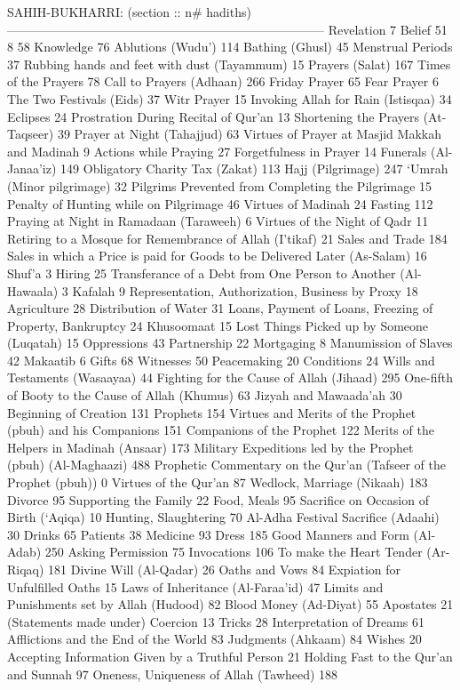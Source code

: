 SAHIH-BUKHARRI:                                       (section :: n# hadiths)
-----------------------------------------------------------------------------
Revelation	7
Belief	51	8	58
Knowledge	76
Ablutions (Wudu')	114
Bathing (Ghusl)	45
Menstrual Periods	37
Rubbing hands and feet with dust (Tayammum)	15
Prayers (Salat)	167
Times of the Prayers	78
Call to Prayers (Adhaan)	266
Friday Prayer	65
Fear Prayer	6
The Two Festivals (Eids)	37
Witr Prayer	15
Invoking Allah for Rain (Istisqaa)	34
Eclipses	24
Prostration During Recital of Qur'an	13
Shortening the Prayers (At-Taqseer)	39
Prayer at Night (Tahajjud)	63
Virtues of Prayer at Masjid Makkah and Madinah	9
Actions while Praying	27
Forgetfulness in Prayer	14
Funerals (Al-Janaa'iz)	149
Obligatory Charity Tax (Zakat)	113
Hajj (Pilgrimage)	247
`Umrah (Minor pilgrimage)	32
Pilgrims Prevented from Completing the Pilgrimage	15
Penalty of Hunting while on Pilgrimage	46
Virtues of Madinah	24
Fasting	112
Praying at Night in Ramadaan (Taraweeh)	6
Virtues of the Night of Qadr	11
Retiring to a Mosque for Remembrance of Allah (I'tikaf)	21
Sales and Trade	184
Sales in which a Price is paid for Goods to be Delivered Later (As-Salam)	16
Shuf'a	3
Hiring	25
Transferance of a Debt from One Person to Another (Al-Hawaala)	3
Kafalah	9
Representation, Authorization, Business by Proxy	18
Agriculture	28
Distribution of Water	31
Loans, Payment of Loans, Freezing of Property, Bankruptcy	24
Khusoomaat	15
Lost Things Picked up by Someone (Luqatah)	15
Oppressions	43
Partnership	22
Mortgaging	8
Manumission of Slaves	42
Makaatib	6
Gifts	68
Witnesses	50
Peacemaking	20
Conditions	24
Wills and Testaments (Wasaayaa)	44
Fighting for the Cause of Allah (Jihaad)	295
One-fifth of Booty to the Cause of Allah (Khumus)	63
Jizyah and Mawaada'ah	30
Beginning of Creation	131
Prophets	154
Virtues and Merits of the Prophet (pbuh) and his Companions	151
Companions of the Prophet	122
Merits of the Helpers in Madinah (Ansaar)	173
Military Expeditions led by the Prophet (pbuh) (Al-Maghaazi)	488
Prophetic Commentary on the Qur'an (Tafseer of the Prophet (pbuh))	0
Virtues of the Qur'an	87
Wedlock, Marriage (Nikaah)	183
Divorce	95
Supporting the Family	22
Food, Meals	95
Sacrifice on Occasion of Birth (`Aqiqa)	10
Hunting, Slaughtering	70
Al-Adha Festival Sacrifice (Adaahi)	30
Drinks	65
Patients	38
Medicine	93
Dress	185
Good Manners and Form (Al-Adab)	250
Asking Permission	75
Invocations	106
To make the Heart Tender (Ar-Riqaq)	181
Divine Will (Al-Qadar)	26
Oaths and Vows	84
Expiation for Unfulfilled Oaths	15
Laws of Inheritance (Al-Faraa'id)	47
Limits and Punishments set by Allah (Hudood)	82
Blood Money (Ad-Diyat)	55
Apostates	21
(Statements made under) Coercion	13
Tricks	28
Interpretation of Dreams	61
Afflictions and the End of the World	83
Judgments (Ahkaam)	84
Wishes	20
Accepting Information Given by a Truthful Person	21
Holding Fast to the Qur'an and Sunnah	97
Oneness, Uniqueness of Allah (Tawheed)	188






